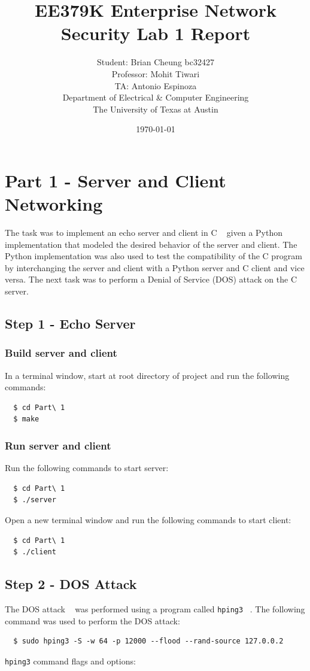 \documentclass[11pt]{article}
\author{Student: Brian Cheung bc32427 \\ Professor: Mohit Tiwari \\ TA: Antonio Espinoza \\ Department of Electrical \& Computer Engineering \\ The University of Texas at Austin}
\date{\today}
\title{EE379K Enterprise Network Security Lab 1 Report}
\begin{document}
\maketitle
\newpage
\section*{Part 1 - Server and Client Networking}
\label{sec:part-1}
The task was to implement an echo server and client in C ~\cite{echo} given a Python implementation that modeled the desired behavior of the server and client.
The Python implementation was also used to test the compatibility of the C program by interchanging the server and client with a Python server and C client and vice versa.
The next task was to perform a Denial of Service (DOS) attack on the C server.
\subsection*{Step 1 - Echo Server}
\subsubsection*{Build server and client}
In a terminal window, start at root directory of project and run the following commands:
\begin{verbatim}
  $ cd Part\ 1
  $ make
\end{verbatim}
\subsubsection*{Run server and client}
Run the following commands to start server:
\begin{verbatim}
  $ cd Part\ 1
  $ ./server
\end{verbatim}
Open a new terminal window and run the following commands to start client:
\begin{verbatim}
  $ cd Part\ 1
  $ ./client
\end{verbatim}
\subsection*{Step 2 - DOS Attack}
The DOS attack ~\cite{dos} was performed using a program called \verb|hping3| ~\cite{hping3}.
\noindent The following command was used to perform the DOS attack:
\begin{verbatim}
  $ sudo hping3 -S -w 64 -p 12000 --flood --rand-source 127.0.0.2
\end{verbatim}
\verb|hping3| command flags and options:
\end{document}
